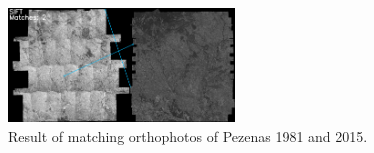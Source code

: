 \begin{figure}[htbp]
\begin{center}
{\begin{minipage}[t]{0.48\linewidth}
                \centering
                \includegraphics[width=6cm]{images/Chapitre3/Homol-SIFT-2DRANSAC_Ortho-MEC-Malt_Tapas_1981_Ortho-MEC-Malt_2015.png}
            \end{minipage}%
        }
        \caption{Result of matching orthophotos of Pezenas 1981 and 2015.}
        \label{Match result}
    \end{center}
\end{figure} 

